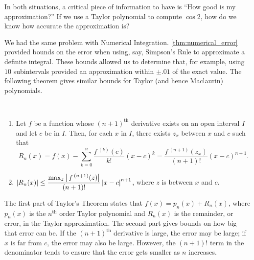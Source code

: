 	
In both situations, a critical piece of information to have is ``How good is my approximation?'' If we use a Taylor polynomial to compute $\cos 2$, how do we know how accurate the approximation is? 

We had the same problem with Numerical Integration. \autoref{thm:numerical_error} provided bounds on the error when using, say, Simpson's Rule to approximate a definite integral. These bounds allowed us to determine that, for example, using $10$ subintervals provided an approximation within $\pm .01$ of the exact value. The following theorem gives similar bounds for Taylor (and hence Maclaurin) polynomials.

{
\begin{theorem}\label{thm:taylorthm}%
\mbox{}\\[-2\baselineskip]
\begin{enumerate}
	\item	Let $f$ be a function whose $(n+1)^{\text{th}}$ derivative exists on an open interval $I$ and let $c$ be in $I$. Then, for each $x$ in $I$, there exists $z_x$ between $x$ and $c$ such that\vspace{-.3\baselineskip}
\[R_n(x) = f(x) - \sum_{k=0}^n\frac{f\,^{(k)}(c)}{k!}(x-c)^k = \frac{f\,^{(n+1)}(z_x)}{(n+1)!}(x-c)^{n+1}.\]
	\item	$\left\lvert R_n(x) \right\rvert\leq\dfrac{\max_z\left\lvert \,f\,^{(n+1)}(z) \right\rvert}{(n+1)!}\left\lvert x-c \right\rvert^{n+1}$, where $z$ is between $x$ and $c$.
\end{enumerate}
\end{theorem}}

The first part of Taylor's Theorem states that $f(x) = p_n(x) + R_n(x)$, where $p_n(x)$ is the $n^{\text{th}}$ order Taylor polynomial and $R_n(x)$ is the remainder, or error, in the Taylor approximation. The second part gives bounds on how big that error can be. If the $(n+1)^{\text{th}}$ derivative is large, the error may be large; if $x$ is far from $c$, the error may also be large. However, the $(n+1)!$ term in the denominator tends to ensure that the error gets smaller as $n$ increases.

